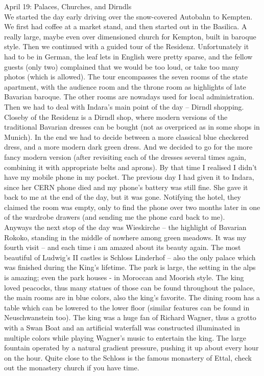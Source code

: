 April 19: Palaces, Churches, and Dirndls\\
We started the day early driving over the snow-covered Autobahn to Kempten. We first had coffee at a market stand, and then started out in the Basilica. A really large, maybe even over dimensioned church for Kempton, built in baroque style. Then we continued with a guided tour of the Residenz. Unfortunately it had to be in German, the leaf lets in English were pretty sparse, and the fellow guests (only two) complained that we would be too loud, or take too many photos (which is allowed). The tour encompasses the seven rooms of the state apartment, with the audience room and the throne room as highlights of late Bavarian baroque. The other rooms are nowadays used for local administration.\\
Then we had to deal with Indara's main point of the day -- Dirndl shopping. Closeby of the Residenz is a Dirndl shop, where modern versions of the traditional Bavarian dresses can be bought (not as overpriced as in some shops in Munich). In the end we had to decide between a more classical blue checkered dress, and a more modern dark green dress. And we decided to go for the more fancy modern version (after revisiting each of the dresses several times again, combining it with appropriate belts and aprons). By that time I realised I didn't have my mobile phone in my pocket. The previous day I had given it to Indara, since her CERN phone died and my phone's battery was still fine. She gave it back to me at the end of the day, but it was gone. Notifying the hotel, they claimed the room was empty, only to find the phone over two months later in one of the wardrobe drawers (and sending me the phone card back to me).\\
Anyways the next stop of the day was Wieskirche -- the highlight of Bavarian Rokoko, standing in the middle of nowhere among green meadows. It was my fourth visit -- and each time i am amazed about its beauty again. The most beautiful of Ludwig's II castles is Schloss Linderhof -- also the only palace which was finished during the King's lifetime. The park is large, the setting in the alps is amazing; even the park houses - in Moroccan and Moorish style. The king loved peacocks, thus many statues of those can be found throughout the palace, the main rooms are in blue colors, also the king's favorite. The dining room has a table which can be lowered to the lower floor (similar features can be found in Neuschwanstein too). The king was a huge fan of Richard Wagner, thus a grotto with a Swan Boat and an artificial waterfall was constructed illuminated in multiple colors while playing Wagner's music to entertain the king. The large fountain operated by a natural gradient pressure, pushing it up about every hour on the hour. Quite close to the Schloss is the famous monastery of Ettal, check out the monastery church if you have time.\\ 
